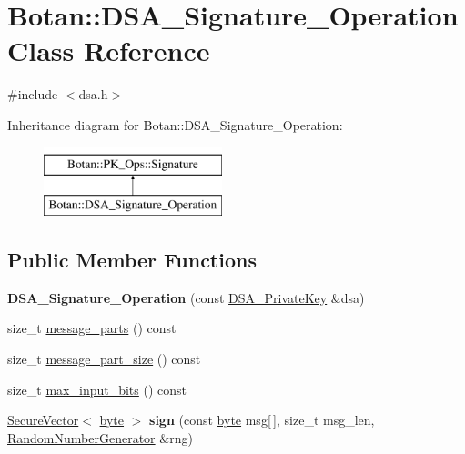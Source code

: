 \hypertarget{classBotan_1_1DSA__Signature__Operation}{\section{Botan\-:\-:D\-S\-A\-\_\-\-Signature\-\_\-\-Operation Class Reference}
\label{classBotan_1_1DSA__Signature__Operation}
}


{\ttfamily \#include $<$dsa.\-h$>$}

Inheritance diagram for Botan\-:\-:D\-S\-A\-\_\-\-Signature\-\_\-\-Operation\-:\begin{figure}[H]
\begin{center}
\leavevmode
\includegraphics[height=2.000000cm]{classBotan_1_1DSA__Signature__Operation}
\end{center}
\end{figure}
\subsection*{Public Member Functions}
\begin{DoxyCompactItemize}
\item 
\hypertarget{classBotan_1_1DSA__Signature__Operation_a91a35c36537aed9352a9b60d856e273d}{{\bfseries D\-S\-A\-\_\-\-Signature\-\_\-\-Operation} (const \hyperlink{classBotan_1_1DSA__PrivateKey}{D\-S\-A\-\_\-\-Private\-Key} \&dsa)}\label{classBotan_1_1DSA__Signature__Operation_a91a35c36537aed9352a9b60d856e273d}

\item 
size\-\_\-t \hyperlink{classBotan_1_1DSA__Signature__Operation_a12213da35063b1a68a13c19ec15f24cb}{message\-\_\-parts} () const 
\item 
size\-\_\-t \hyperlink{classBotan_1_1DSA__Signature__Operation_aa6919e5da9c23c4cd0bd40cd652eda8e}{message\-\_\-part\-\_\-size} () const 
\item 
size\-\_\-t \hyperlink{classBotan_1_1DSA__Signature__Operation_ad8923b193fe7449d3f3a503f0d8bfc12}{max\-\_\-input\-\_\-bits} () const 
\item 
\hypertarget{classBotan_1_1DSA__Signature__Operation_a5350f5838bd7cbac3f73bb9452ecfefb}{\hyperlink{classBotan_1_1SecureVector}{Secure\-Vector}$<$ \hyperlink{namespaceBotan_a7d793989d801281df48c6b19616b8b84}{byte} $>$ {\bfseries sign} (const \hyperlink{namespaceBotan_a7d793989d801281df48c6b19616b8b84}{byte} msg\mbox{[}$\,$\mbox{]}, size\-\_\-t msg\-\_\-len, \hyperlink{classBotan_1_1RandomNumberGenerator}{Random\-Number\-Generator} \&rng)}\label{classBotan_1_1DSA__Signature__Operation_a5350f5838bd7cbac3f73bb9452ecfefb}

\end{DoxyCompactItemize}


